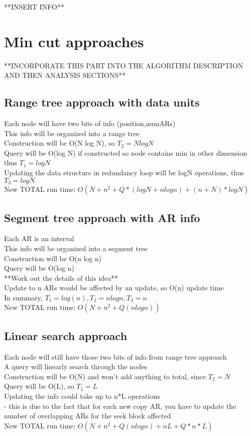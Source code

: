 \documentclass[11pt,psfig]{article}
\begin{document}
**INSERT INFO**

\section*{Min cut approaches}

**INCORPORATE THIS PART INTO THE ALGORITHM DESCRIPTION AND THEN ANALYSIS SECTIONS**

\subsection*{Range tree approach with data units}
Each node will have two bits of info (position,numARs)\\
This info will be organized into a range tree\\
Construction will be O(N log N), so $T_2=N logN$\\
Query will be O(log N) if constructed so node contains min in other dimension\\
 thus $T_1=logN$\\
Updating the data structure in redundancy loop will be logN operations, thus\\
 $T_3 = logN$\\
New TOTAL run time: $O(N + n^2 + Q*(logN + n log n) + (n+N)*logN)$

\subsection*{Segment tree approach with AR info}
		Each AR is an interval\\
		This info will be organized into a segment tree\\
		Construction will be O(n log n)\\
		Query will be O(log n)\\
			**Work out the details of this idea**\\
		Update to n ARs would be affected by an update, so O(n) update time\\
		In summary, $T_1=log(n), T_2=n logn, T_3 = n$\\
		New TOTAL run time: $O(N + n^2 + Q(n log n))$\\
\subsection*{Linear search approach}
		Each node will still have those two bits of info from range tree approach\\
		A query will linearly search through the nodes\\
		Construction will be O(N) and won't add anything to total, since $T_2 = N$\\
		Query will be O(L), so $T_1 = L$\\
		Updating the info could take up to n*L operations\\
			- this is due to the fact that for each new copy AR, you have to update 
				the number of overlapping ARs for the seek block affected\\
		New TOTAL run time: $O(N + n^2 + Q(n logn) + nL + Q*n*L)$
\end{document}
